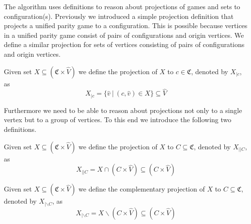 The algorithm uses definitions to reason about projections of games and sets to configuration(s). Previously we introduced a simple projection definition that projects a unified parity game to a configuration. This is possible because vertices in a unified parity game consist of pairs of configurations and origin vertices. We define a similar projection for sets of vertices consisting of pairs of configurations and origin vertices.
\begin{definition}
	Given set $X \subseteq (\mathfrak{C} \times \hat{V})$ we define the projection of $X$ to $c \in \mathfrak{C}$, denoted by $X_{|c}$, as
	\[ X_{|c} = \{ \hat{v}\ |\ (c,\hat{v}) \in X \} \subseteq \hat{V} \]
\end{definition}
Furthermore we need to be able to reason about projections not only to a single vertex but to a group of vertices. To this end we introduce the following two definitions.
\begin{definition}
	Given set $X \subseteq (\mathfrak{C} \times \hat{V})$ we define the projection of $X$ to $C \subseteq \mathfrak{C}$, denoted by $X_{||C}$, as
	\[ X_{||C} = X \cap (C \times \hat{V}) \subseteq (C \times \hat{V}) \]
\end{definition}
\begin{definition}
Given set $X \subseteq (\mathfrak{C} \times \hat{V})$ we define the complementary projection of $X$ to $C \subseteq \mathfrak{C}$, denoted by $X_{|\backslash C}$, as
\[ X_{|\backslash C} = X \backslash (C \times \hat{V}) \subseteq (C \times \hat{V}) \]
\end{definition}

